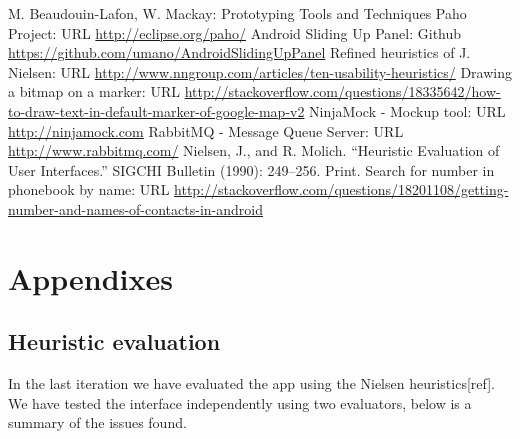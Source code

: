 \documentclass[runningheads,a4paper]{llncs}
\begin{document}
\begin{thebibliography}{4}

 M. Beaudouin-Lafon, W. Mackay: Prototyping Tools and Techniques
 Paho Project: URL \url{http://eclipse.org/paho/}
 Android Sliding Up Panel: Github \url{https://github.com/umano/AndroidSlidingUpPanel}
Refined heuristics of J. Nielsen: URL \url{http://www.nngroup.com/articles/ten-usability-heuristics/}
 Drawing a bitmap on a marker: URL \url{http://stackoverflow.com/questions/18335642/how-to-draw-text-in-default-marker-of-google-map-v2}
 NinjaMock - Mockup tool: URL \url{http://ninjamock.com}
 RabbitMQ - Message Queue Server: URL \url{http://www.rabbitmq.com/}
Nielsen, J., and R. Molich. “Heuristic Evaluation of User Interfaces.” SIGCHI Bulletin (1990): 249–256. Print.
 Search for number in phonebook by name: URL \url{http://stackoverflow.com/questions/18201108/getting-number-and-names-of-contacts-in-android}



\end{thebibliography}


\section*{Appendixes}

\subsection*{Heuristic evaluation}
In the last iteration we have evaluated the app using the Nielsen heuristics[ref].
We have tested the interface independently using two evaluators, below is a summary of the issues found.\\
\end{document}
